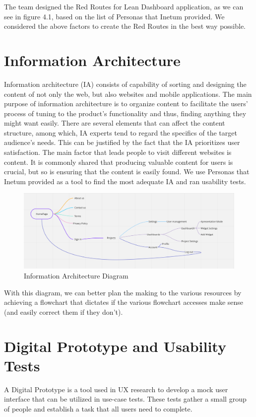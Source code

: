 \documentclass[a4paper,twoside,10pt]{report}
\begin{document}
The team designed the Red Routes for Lean Dashboard application, as we can see in figure 4.1, based on the list of Personas that Inetum provided. We considered the above factors to create the Red Routes in the best way possible.
\newpage

\section{Information Architecture}
Information architecture (IA) consists of capability of sorting and designing the content of not only the web, but also websites and mobile applications. 
The main purpose of information architecture is to organize content to facilitate the users' process of tuning to the product's functionality and thus, finding anything they might want easily.
There are several elements that can affect the content structure, among which, IA experts tend to regard the specifics of the target audience's needs. This can be justified by the fact that the IA prioritizes user satisfaction.
The main factor that leads people to visit different websites is content. It is commonly shared that producing valuable content for users is crucial, but so is ensuring that the content is easily found. We use Personas that Inetum provided as a tool to find the most adequate IA and ran usability tests.
 
\begin{figure}[h!]
\center
    \includegraphics[width=\textwidth]{information-architecture.png}
\caption{Information Architecture Diagram}
\end{figure}

With this diagram, we can better plan the making to the various resources by achieving a flowchart that dictates if the various flowchart accesses make sense (and easily correct them if they don't).

\newpage
\section{Digital Prototype and Usability Tests}
A Digital Prototype is a tool used in UX research to develop a mock user interface that can be utilized in use-case tests. These tests gather a small group of people and establish a task that all users need to complete. 
 
\end{document}
